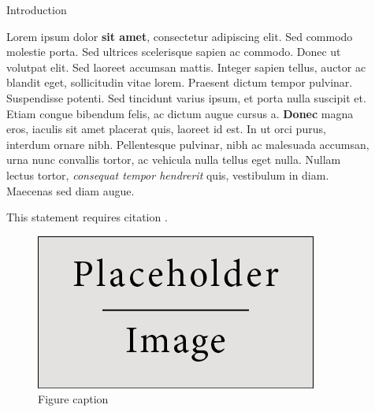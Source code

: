 \documentclass[final]{beamer}
\newlength{\sepwid}
\newlength{\onecolwid}
\newlength{\twocolwid}
\begin{document}
\begin{frame}[t]
\begin{columns}[t]
\begin{column}{\onecolwid}
			\begin{block}{Introduction}

				Lorem ipsum dolor \textbf{sit amet}, consectetur adipiscing elit. Sed commodo molestie porta. Sed ultrices scelerisque sapien ac commodo. Donec ut volutpat elit. Sed laoreet accumsan mattis. Integer sapien tellus, auctor ac blandit eget, sollicitudin vitae lorem. Praesent dictum tempor pulvinar. Suspendisse potenti. Sed tincidunt varius ipsum, et porta nulla suscipit et. Etiam congue bibendum felis, ac dictum augue cursus a. \textbf{Donec} magna eros, iaculis sit amet placerat quis, laoreet id est. In ut orci purus, interdum ornare nibh. Pellentesque pulvinar, nibh ac malesuada accumsan, urna nunc convallis tortor, ac vehicula nulla tellus eget nulla. Nullam lectus tortor, \textit{consequat tempor hendrerit} quis, vestibulum in diam. Maecenas sed diam augue.

				This statement requires citation \cite{Smith:2012qr}.

			\end{block}


			\begin{figure}
				\includegraphics[width=0.8\linewidth]{placeholder.jpg}
				\caption{Figure caption}
			\end{figure}


		\end{column} %

		\begin{column}{\sepwid}\end{column} %

		\begin{column}{\twocolwid} %


\end{column}
\end{columns}
\end{frame}
\end{document}
